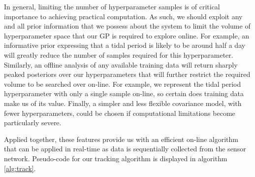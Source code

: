 \documentclass{acmtrans2m}
\begin{document}
In general, limiting the number of hyperparameter samples is of critical importance to achieving practical computation. As such, we should exploit any and all prior information that we possess about the system to limit the volume of hyperparameter space that our GP is required to explore online. For example, an informative prior expressing that a tidal period is likely to be around half a day will greatly reduce the number of samples required for this hyperparameter. Similarly, an offline analysis of any available training data will return sharply peaked posteriors over our hyperparameters that will further restrict the required volume to be searched over on-line. For example, we represent the tidal period hyperparameter with only a single sample on-line, so certain does training data make us of its value. Finally, a simpler and less flexible covariance model, with fewer hyperparameters, could be chosen if computational limitations become particularly severe. 

Applied together, these features provide us with an efficient on-line algorithm that can be applied in real-time as data is sequentially collected from the sensor network. Pseudo-code for our tracking algorithm is displayed in algorithm \ref{alg:track}.
\end{document}
